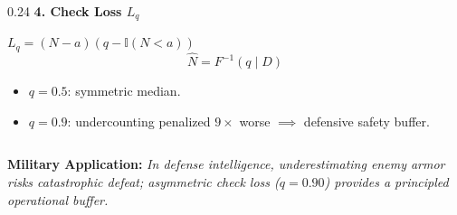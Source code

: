 \documentclass[aspectratio=169,10pt]{beamer}
\begin{document}
\begin{frame}[c]
\begin{columns}[t,onlytextwidth]
    \begin{column}{0.24\textwidth}
      {\small \textbf{\color{headernavy} 4. Check Loss $L_q$}}\\[0.04cm]
      {\scriptsize $L_q = (N-a)(q - \mathbb{I}(N < a))$
      \begin{equation*}
        \widehat{N} = F^{-1}(q \mid D)
      \end{equation*}
      \begin{itemize}
        \setlength{\itemsep}{0.04cm}
        \item $q=0.5$: symmetric median.
        \item $q=0.9$: undercounting penalized $9\times$ worse $\implies$ defensive safety buffer.
      \end{itemize}}
    \end{column}
  \end{columns}
  
  \vspace{0.30cm}
  \begin{center}
    {\footnotesize \textbf{\color{headernavy} Military Application: } \textit{In defense intelligence, underestimating enemy armor risks catastrophic defeat; asymmetric check loss ($q=0.90$) provides a principled operational buffer.}}
  \end{center}
\end{frame}
\end{document}
